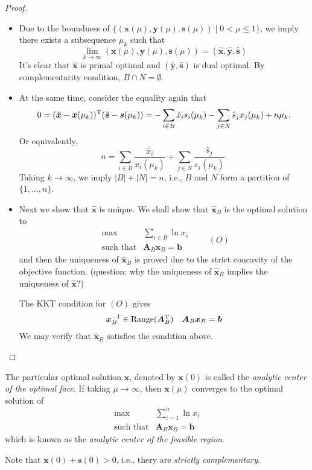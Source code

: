 \begin{proof}
\begin{itemize}
\item
Due to the boundness of $\{(\bm x(\mu),\bm y(\mu),\bm s(\mu))\mid 0<\mu\le 1\}$, we imply there exists a subsequence $\mu_k$ such that
\[
\lim_{k\to\infty}(\bm x(\mu),\bm y(\mu),\bm s(\mu)) = (\hat{\bm x},\hat{\bm y},\hat{\bm s})
\]
It's clear that $\hat{\bm x}$ is primal optimal and $(\hat{\bm y},\hat{\bm s})$ is dual optimal. By complementarity condition, $B\cap N=\emptyset$.
\item
At the same time, consider the equality again that
\[
0 = (\hat{\bm x} - \bm x(\mu_k))^{\mathrm T}(\hat{\bm s} - \bm s(\mu_k)) = -\sum_{i\in B}\hat x_is_i(\mu_k)
-
\sum_{j\in N}\hat s_jx_j(\mu_k) + n\mu_k.
\]
Or equivalently,
\[
n = \sum_{i\in B}\frac{\hat x_i}{x_i(\mu_k)}+\sum_{j\in N}\frac{\hat s_j}{s_j(\mu_k)}.
\]
Taking $k\to\infty$, we imply $|B|+|N| = n$, i.e., $B$ and $N$ form a partition of $\{1,\dots,n\}$.
\item
Next we show that $\hat{\bm x}$ is unique. We shall show that $\hat{\bm x}_B$ is the optimal solution to 
\[
\begin{array}{ll}
\max&\sum_{i\in B}\ln x_i\\
\mbox{such that}&\bm A_B\bm x_B=\bm b
\end{array}\qquad
(O)
\]
and then the uniqueness of $\hat{\bm x}_B$ is proved due to the strict concavity of the objective function. (question: why the uniqueness of $\hat{\bm x}_B$ implies the uniqueness of $\hat{\bm x}$?)

The KKT condition for $(O)$ gives
\[
\begin{array}{ll}
\bm x_B^{-1}\in\text{Range}(\bm A_B^{\mathrm T})
&
\bm A_B\bm x_B=\bm b
\end{array}
\]
We may verify that $\hat{\bm x}_B$ satisfies the condition above.
\end{itemize}
\end{proof}
\begin{remark}
The particular optimal solution $\bm x$, denoted by $\bm x(0)$ is called the \emph{analytic center of the optimal face}. If taking $\mu\to\infty$, then $\bm x(\mu)$ converges to the optimal solution of
\[
\begin{array}{ll}
\max&\sum_{i=1}^n\ln x_i\\
\mbox{such that}&\bm A_B\bm x_B=\bm b
\end{array}
\]
which is known as the \emph{analytic center of the feasible region}.

Note that $\bm x(0)+\bm s(0)>0$, i.e., thery are \emph{strictly complementary}.
\end{remark}
